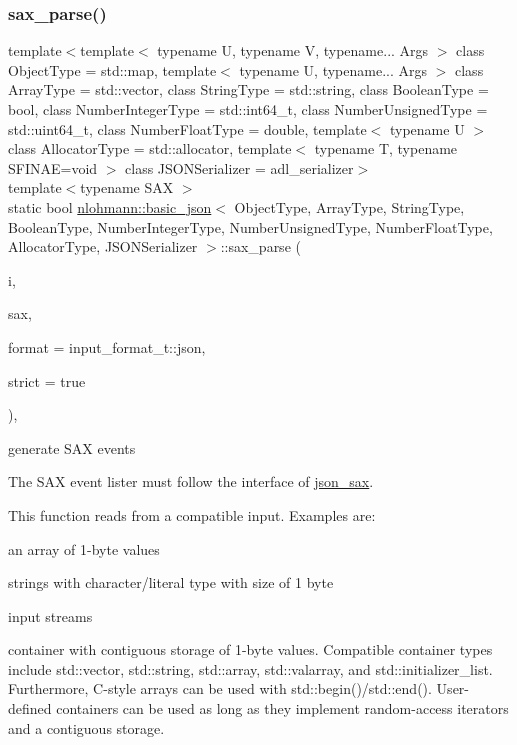 \subsubsection{\texorpdfstring{sax\+\_\+parse()}{sax\_parse()}}
{\footnotesize\ttfamily template$<$template$<$ typename U, typename V, typename... Args $>$ class Object\+Type = std\+::map, template$<$ typename U, typename... Args $>$ class Array\+Type = std\+::vector, class String\+Type  = std\+::string, class Boolean\+Type  = bool, class Number\+Integer\+Type  = std\+::int64\+\_\+t, class Number\+Unsigned\+Type  = std\+::uint64\+\_\+t, class Number\+Float\+Type  = double, template$<$ typename U $>$ class Allocator\+Type = std\+::allocator, template$<$ typename T, typename S\+F\+I\+N\+A\+E=void $>$ class J\+S\+O\+N\+Serializer = adl\+\_\+serializer$>$ \\
template$<$typename S\+AX $>$ \\
static bool \mbox{\hyperlink{classnlohmann_1_1basic__json}{nlohmann\+::basic\+\_\+json}}$<$ Object\+Type, Array\+Type, String\+Type, Boolean\+Type, Number\+Integer\+Type, Number\+Unsigned\+Type, Number\+Float\+Type, Allocator\+Type, J\+S\+O\+N\+Serializer $>$\+::sax\+\_\+parse (\begin{DoxyParamCaption}\item[{\mbox{\hyperlink{classnlohmann_1_1detail_1_1input__adapter}{detail\+::input\+\_\+adapter}} \&\&}]{i,  }\item[{S\+AX $\ast$}]{sax,  }\item[{\mbox{\hyperlink{namespacenlohmann_1_1detail_aa554fc6a11519e4f347deb25a9f0db40}{input\+\_\+format\+\_\+t}}}]{format = {\ttfamily input\+\_\+format\+\_\+t\+:\+:json},  }\item[{const bool}]{strict = {\ttfamily true} }\end{DoxyParamCaption})\hspace{0.3cm}{\ttfamily [inline]}, {\ttfamily [static]}}



generate S\+AX events 

The S\+AX event lister must follow the interface of \mbox{\hyperlink{structnlohmann_1_1json__sax}{json\+\_\+sax}}.

This function reads from a compatible input. Examples are\+:
\begin{DoxyItemize}
\item an array of 1-\/byte values
\item strings with character/literal type with size of 1 byte
\item input streams
\item container with contiguous storage of 1-\/byte values. Compatible container types include {\ttfamily std\+::vector}, {\ttfamily std\+::string}, {\ttfamily std\+::array}, {\ttfamily std\+::valarray}, and {\ttfamily std\+::initializer\+\_\+list}. Furthermore, C-\/style arrays can be used with {\ttfamily std\+::begin()}/{\ttfamily std\+::end()}. User-\/defined containers can be used as long as they implement random-\/access iterators and a contiguous storage.
\end{DoxyItemize}

